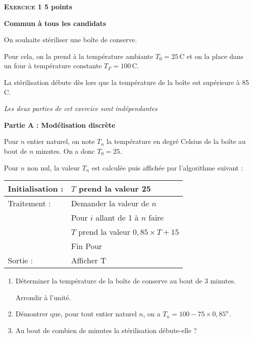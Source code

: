 \documentclass[10pt]{article}
\begin{document}
\setlength\parindent{0mm}
\renewcommand \footrulewidth{.2pt}
\pagestyle{fancy}
\thispagestyle{empty}

\textbf{\textsc{Exercice 1} \hfill 5 points}
 
\textbf{Commun  à tous les candidats}

\medskip

On souhaite stériliser une boîte de conserve.

Pour cela, on la prend à la température ambiante $T_0 = 25$\,\degres C et on la place dans un four à
température constante $T_F = 100$\,\degres C.

La stérilisation débute dès lors que la température de la boîte est supérieure à 85\,\degres C.

\smallskip

\emph{Les deux parties de cet exercice sont indépendantes}

\bigskip

\textbf{Partie A : Modélisation discrète}

\medskip

Pour $n$ entier naturel, on note $T_n$ la température en degré Celsius de la boîte au bout de $n$
minutes. On a donc $T_0 = 25$.

Pour $n$ non nul, la valeur $T_n$ est calculée puis affichée par l'algorithme suivant :

\begin{center}
\begin{tabularx}{0.7\linewidth}{|l|X|}\hline
Initialisation : 	&$T$ prend la valeur 25\\ \hline
Traitement :		& Demander la valeur de $n$\\
					&Pour $i$ allant de 1 à $n$ faire\\
					&\hspace{0,5cm}$T$ prend la valeur $0,85 \times  T + 15$\\
					&Fin Pour\\ \hline
Sortie : 			&Afficher T\\ \hline
\end{tabularx}
\end{center}

\begin{enumerate}
\item Déterminer la température de la boîte de conserve au bout de 3 minutes.

Arrondir à l'unité.
\item Démontrer que, pour tout entier naturel $n$, on a $T_n = 100 - 75 \times 0,85^n$.
\item Au bout de combien de minutes la stérilisation débute-elle ?
\end{enumerate}
\end{document}
